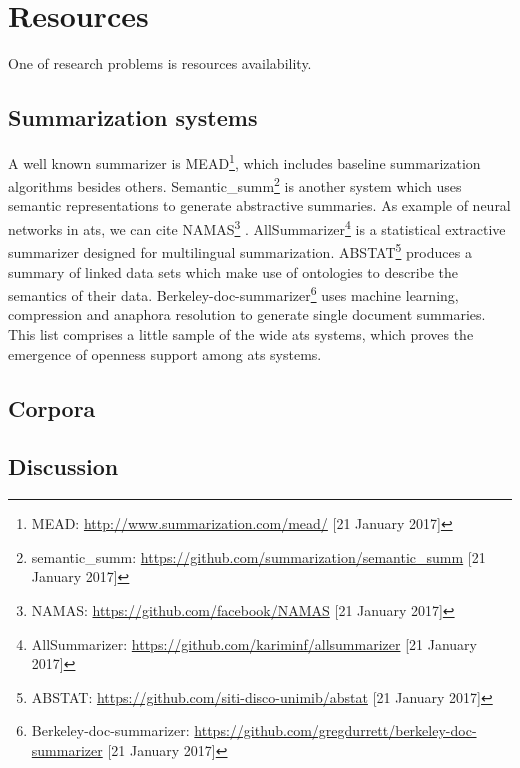 \chapter{Resources}

One of research problems is resources availability.


\section{Summarization systems}


A well known summarizer is MEAD\footnote{MEAD: \url{http://www.summarization.com/mead/} [21 January 2017]}, which includes baseline summarization algorithms besides others.
%
Semantic\_summ\footnote{semantic\_summ: \url{https://github.com/summarization/semantic_summ} [21 January 2017]} \citep{15-liu-al} is another system which uses semantic representations to generate abstractive summaries.
As example of neural networks in \ac{ats}, we can cite NAMAS\footnote{NAMAS: \url{https://github.com/facebook/NAMAS} [21 January 2017]} \citep{15-rush-al}.
AllSummarizer\footnote{AllSummarizer: \url{https://github.com/kariminf/allsummarizer} [21 January 2017]} \citep{15-aries-al} is a statistical extractive summarizer designed for multilingual summarization.
ABSTAT\footnote{ABSTAT: \url{https://github.com/siti-disco-unimib/abstat} [21 January 2017]} \citep{15-palmonari-al} produces a summary of linked data sets which make use of ontologies to describe the semantics of their data.
Berkeley-doc-summarizer\footnote{Berkeley-doc-summarizer: \url{https://github.com/gregdurrett/berkeley-doc-summarizer} [21 January 2017]} \citep{16-durrett-al} uses machine learning, compression and anaphora resolution to generate single document summaries.
This list comprises a little sample of the wide \ac{ats} systems, which proves the emergence of openness support among \ac{ats} systems.

\section{Corpora}



\section{Discussion}